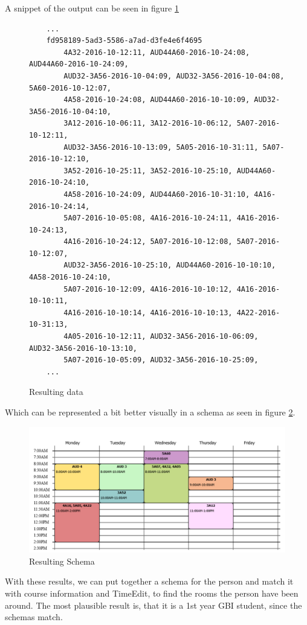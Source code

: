 A snippet of the output can be seen in figure \ref{fig:result_data}
\begin{figure}[H]
	\begin{verbatim}
	...
	fd958189-5ad3-5586-a7ad-d3fe4e6f4695	
	    4A32-2016-10-12:11, AUD44A60-2016-10-24:08, AUD44A60-2016-10-24:09, 
	    AUD32-3A56-2016-10-04:09, AUD32-3A56-2016-10-04:08, 5A60-2016-10-12:07, 
	    4A58-2016-10-24:08, AUD44A60-2016-10-10:09, AUD32-3A56-2016-10-04:10, 
	    3A12-2016-10-06:11, 3A12-2016-10-06:12, 5A07-2016-10-12:11, 
	    AUD32-3A56-2016-10-13:09, 5A05-2016-10-31:11, 5A07-2016-10-12:10,
	    3A52-2016-10-25:11, 3A52-2016-10-25:10, AUD44A60-2016-10-24:10,
	    4A58-2016-10-24:09, AUD44A60-2016-10-31:10, 4A16-2016-10-24:14,
	    5A07-2016-10-05:08, 4A16-2016-10-24:11, 4A16-2016-10-24:13,
	    4A16-2016-10-24:12, 5A07-2016-10-12:08, 5A07-2016-10-12:07,
	    AUD32-3A56-2016-10-25:10, AUD44A60-2016-10-10:10, 4A58-2016-10-24:10,
	    5A07-2016-10-12:09, 4A16-2016-10-10:12, 4A16-2016-10-10:11,
	    4A16-2016-10-10:14, 4A16-2016-10-10:13, 4A22-2016-10-31:13,
	    4A05-2016-10-12:11, AUD32-3A56-2016-10-06:09, AUD32-3A56-2016-10-13:10,
	    5A07-2016-10-05:09, AUD32-3A56-2016-10-25:09,
	...
	\end{verbatim}
	\caption{Resulting data}
	\label{fig:result_data}
\end{figure}

Which can be represented a bit better visually in a schema as seen in figure \ref{fig:result_schema}.

\begin{figure}[H]
	\centering
	\includegraphics[width=\linewidth]{figures/schema-from-data.png}
	\caption{Resulting Schema}
	\label{fig:result_schema}
\end{figure}

With these results, we can put together a schema for the person and match it with course information and TimeEdit, to find the rooms the person have been around. The most plausible result is, that it is a 1st year GBI student, since the schemas match.


